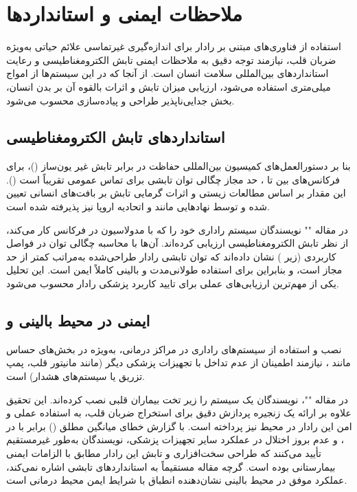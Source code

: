 \section{ملاحظات ایمنی و استانداردها} %
\label{sec:safety-standards}

استفاده از فناوری‌های مبتنی بر رادار  برای اندازه‌گیری غیرتماسی علائم حیاتی به‌ویژه ضربان قلب، نیازمند توجه دقیق به ملاحظات ایمنی تابش الکترومغناطیسی و رعایت استانداردهای بین‌المللی سلامت انسان است. از آنجا که در این سیستم‌ها از امواج میلی‌متری استفاده می‌شود، ارزیابی میزان تابش و اثرات بالقوه آن بر بدن انسان، بخش جدایی‌ناپذیر طراحی و پیاده‌سازی محسوب می‌شود.

\subsection{استانداردهای تابش الکترومغناطیسی} %
\label{sec:em-radiation-standards}

بنا بر دستورالعمل‌های کمیسیون بین‌المللی حفاظت در برابر تابش غیر یون‌ساز ()، برای فرکانس‌های بین  تا ، حد مجاز چگالی توان تابشی برای تماس عمومی تقریباً  است (). این مقدار بر اساس مطالعات زیستی و اثرات گرمایی تابش بر بافت‌های انسانی تعیین شده و توسط نهادهایی مانند  و اتحادیه اروپا نیز پذیرفته شده است.

در مقاله "" نویسندگان سیستم راداری خود را که با مدولاسیون  در فرکانس  کار می‌کند، از نظر تابش الکترومغناطیسی ارزیابی کرده‌اند. آن‌ها با محاسبه چگالی توان در فواصل کاربردی (زیر ) نشان داده‌اند که توان تابشی رادار طراحی‌شده به‌مراتب کمتر از حد مجاز  است، و بنابراین برای استفاده طولانی‌مدت و بالینی کاملاً ایمن است. این تحلیل یکی از مهم‌ترین ارزیابی‌های عملی برای تایید کاربرد پزشکی رادار محسوب می‌شود.

\subsection{ایمنی در محیط بالینی و } %
\label{sec:clinical-icu-safety}

نصب و استفاده از سیستم‌های راداری در مراکز درمانی، به‌ویژه در بخش‌های حساس مانند ، نیازمند اطمینان از عدم تداخل با تجهیزات پزشکی دیگر (مانند مانیتور قلب، پمپ تزریق یا سیستم‌های هشدار) است.

در مقاله ""، نویسندگان یک سیستم  را زیر تخت بیماران قلبی نصب کرده‌اند. این تحقیق علاوه بر ارائه یک زنجیره پردازش دقیق برای استخراج ضربان قلب، به استفاده عملی و امن این رادار در محیط  نیز پرداخته است. با گزارش خطای میانگین مطلق () برابر با  در ، و عدم بروز اختلال در عملکرد سایر تجهیزات پزشکی، نویسندگان به‌طور غیرمستقیم تأیید می‌کنند که طراحی سخت‌افزاری و تابش این رادار مطابق با الزامات ایمنی بیمارستانی بوده است. گرچه مقاله مستقیماً به استانداردهای تابشی اشاره نمی‌کند، عملکرد موفق در محیط بالینی نشان‌دهنده انطباق با شرایط ایمن محیط درمانی است.

